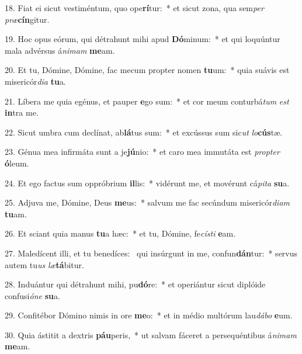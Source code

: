 18. Fiat ei sicut vestiméntum, quo ope\textbf{rí}tur:~*  et sicut zona, qua sem\textit{per} \textit{præ}\textbf{cín}gitur.\

19. Hoc opus eórum, qui détrahunt mihi apud \textbf{Dó}minum:~*  et qui loquúntur mala advérsus á\textit{ni}\textit{mam} \textbf{me}am.\

20. Et tu, Dómine, Dómine, fac mecum propter nomen \textbf{tu}um:~*  quia suávis est misericór\textit{di}\textit{a} \textbf{tu}a.\

21. Líbera me quia egénus, et pauper \textbf{e}go sum:~*  et cor meum conturbá\textit{tum} \textit{est} \textbf{in}tra me.\

22. Sicut umbra cum declínat, ab\textbf{lá}tus sum:~*  et excússus sum sic\textit{ut} \textit{lo}\textbf{cús}tæ.\

23. Génua mea infirmáta sunt a je\textbf{jú}nio:~*  et caro mea immutáta est \textit{prop}\textit{ter} \textbf{ó}leum.\

24. Et ego factus sum oppróbrium \textbf{il}lis:~*  vidérunt me, et movérunt cá\textit{pi}\textit{ta} \textbf{su}a.\

25. Adjuva me, Dómine, Deus \textbf{me}us:~*  salvum me fac secúndum misericór\textit{di}\textit{am} \textbf{tu}am.\

26. Et sciant quia manus \textbf{tu}a hæc:~*  et tu, Dómine, fe\textit{cís}\textit{ti} \textbf{e}am.\

27. Maledícent illi, et tu benedíces: \dag\  qui insúrgunt in me, confun\textbf{dán}tur:~*  servus autem tu\textit{us} \textit{læ}\textbf{tá}bitur.\

28. Induántur qui détrahunt mihi, pu\textbf{dó}re:~*  et operiántur sicut diplóide confusi\textit{ó}\textit{ne} \textbf{su}a.\

29. Confitébor Dómino nimis in ore \textbf{me}o:~*  et in médio multórum lau\textit{dá}\textit{bo} \textbf{e}um.\

30. Quia ástitit a dextris \textbf{páu}peris,~*  ut salvam fáceret a persequéntibus á\textit{ni}\textit{mam} \textbf{me}am.\

